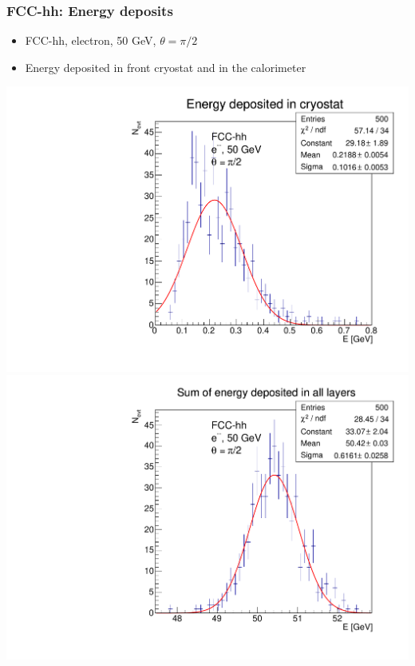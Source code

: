 \documentclass{beamer}
\begin{document}
\begin{frame}
  \frametitle{FCC-hh: Energy deposits}

  \begin{itemize}
    \item FCC-hh, electron, 50 GeV, $\theta = \pi/2$
    \item Energy deposited in front cryostat and in the calorimeter
  \end{itemize}

  \includegraphics[width=0.49\linewidth]{figures/energy_fcchh/energyInCryo.pdf}
  \includegraphics[width=0.49\linewidth]{figures/energy_fcchh/sumEinLayers.pdf}
\end{frame}
\end{document}
